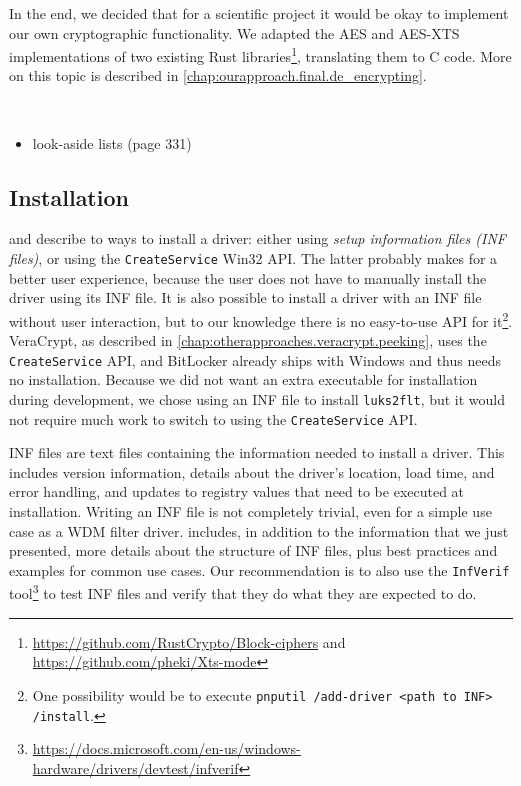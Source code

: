 In the end, we decided that for a scientific project it would be okay to implement our own cryptographic functionality. We adapted the AES and AES-XTS implementations of two existing Rust libraries\footnote{\label{fn:ourapproach.final.rustcrypto} \url{https://github.com/RustCrypto/Block-ciphers} and \url{https://github.com/pheki/Xts-mode}}, translating them to C code. More on this topic is described in \autoref{chap:ourapproach.final.de_encrypting}.

\\

\begin{itemize}
	\item look-aside lists (page 331)
\end{itemize}

\subsection{Installation}
\label{chap:ourapproach.final.install}
\cite{Yosifovich2017} and \cite{Wdk} describe to ways to install a driver: either using \emph{setup information files (INF files)}, or using the \texttt{CreateService} Win32 API. The latter probably makes for a better user experience, because the user does not have to manually install the driver using its INF file. It is also possible to install a driver with an INF file without user interaction, but to our knowledge there is no easy-to-use API for it\footnote{\label{fn:ourapproach.final.automaticinfinstall} One possibility would be to execute \texttt{pnputil /add-driver <path to INF> /install}.}. VeraCrypt, as described in \autoref{chap:otherapproaches.veracrypt.peeking}, uses the \texttt{CreateService} API, and BitLocker already ships with Windows and thus needs no installation. Because we did not want an extra executable for installation during development, we chose using an INF file to install \texttt{luks2flt}, but it would not require much work to switch to using the \texttt{CreateService} API.

INF files are text files containing the information needed to install a driver. This includes version information, details about the driver's location, load time, and error handling, and updates to registry values that need to be executed at installation. Writing an INF file is not completely trivial, even for a simple use case as a WDM filter driver. \cite{Wdk} includes, in addition to the information that we just presented, more details about the structure of INF files, plus best practices and examples for common use cases. Our recommendation is to also use the \texttt{InfVerif} tool\footnote{\label{fn:ourapproach.final.infverif} \url{https://docs.microsoft.com/en-us/windows-hardware/drivers/devtest/infverif}} to test INF files and verify that they do what they are expected to do.

